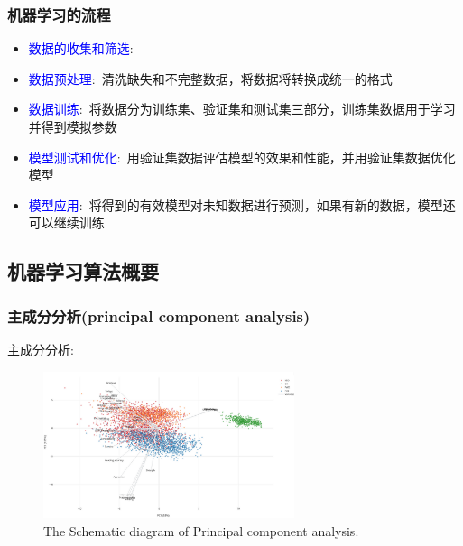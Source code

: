 \frame
{
	\frametitle{机器学习的流程}
\begin{itemize}
	\item \textcolor{blue}{数据的收集和筛选}:~{\fontsize{8.0pt}{4.2pt}\selectfont{从现有数据中产生并选择与问题解决有用和相关的数据子集}}
	\item \textcolor{blue}{数据预处理}:~清洗缺失和不完整数据，将数据将转换成统一的格式{\fontsize{8.0pt}{4.2pt}\selectfont{(如整型、字符串型等)}}%
	\item \textcolor{blue}{数据训练}:~将数据分为训练集、验证集和测试集三部分，训练集数据用于学习并得到模拟参数{\fontsize{8.0pt}{4.2pt}\selectfont{(主要针对监督学习)}}
	\item \textcolor{blue}{模型测试和优化}:~用验证集数据评估模型的效果和性能，并用验证集数据优化模型
		\vskip 3pt
		{\fontsize{8.0pt}{4.2pt}\selectfont{一旦完成优化，用测试集数据评定模型的性能}}%
	\item \textcolor{blue}{模型应用}:~将得到的有效模型对未知数据进行预测，如果有新的数据，模型还可以继续训练
\end{itemize}
}

\subsection{机器学习算法概要}
\frame
{
	\frametitle{主成分分析\textrm{(principal component analysis)}}
	主成分分析:\\
	{\fontsize{8.0pt}{4.2pt}\selectfont{\textcolor{blue}{将高维数据投影到数据点集中的区域，并使数据在新轴向周围聚集度最高}}}
{\fontsize{8.0pt}{4.2pt}}
\begin{figure}[h!]
\centering
\vspace*{-0.1in}
\includegraphics[height=1.70in,width=2.9in,viewport=0 0 1040 620,clip]{Figures/ML_PCM.png}
\caption{\tiny{\textrm{The Schematic diagram of Principal component analysis.}}}%
\label{ML_PCM}
\end{figure}
}

